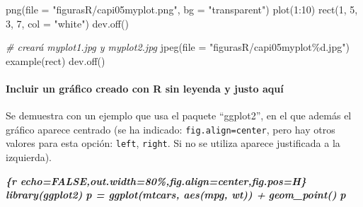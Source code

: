 \documentclass[12pt,a4paper,oneside,]{article}
\newenvironment{Shaded}{\begin{snugshade}}{\end{snugshade}}
\newcommand{\AttributeTok}[1]{\textcolor[rgb]{0.77,0.63,0.00}{#1}}
\newcommand{\CommentTok}[1]{\textcolor[rgb]{0.56,0.35,0.01}{\textit{#1}}}
\newcommand{\DecValTok}[1]{\textcolor[rgb]{0.00,0.00,0.81}{#1}}
\newcommand{\FunctionTok}[1]{\textcolor[rgb]{0.00,0.00,0.00}{#1}}
\newcommand{\InformationTok}[1]{\textcolor[rgb]{0.56,0.35,0.01}{\textbf{\textit{#1}}}}
\newcommand{\NormalTok}[1]{#1}
\newcommand{\SpecialCharTok}[1]{\textcolor[rgb]{0.00,0.00,0.00}{#1}}
\newcommand{\StringTok}[1]{\textcolor[rgb]{0.31,0.60,0.02}{#1}}
\let\oldparagraph\paragraph
\renewcommand{\paragraph}[1]{\oldparagraph{#1}\mbox{}}
\numberwithin{dummy}{section}
\theoremstyle{ocrenumbox}
\theoremstyle{blacknumex}
\theoremstyle{blacknumbox}
\theoremstyle{ocrenum}
\theoremstyle{ocrenum}
\begin{document}
\begin{Shaded}
\begin{Highlighting}[]
\FunctionTok{png}\NormalTok{(}\AttributeTok{file =} \StringTok{"figurasR/capi05myplot.png"}\NormalTok{, }\AttributeTok{bg =} \StringTok{"transparent"}\NormalTok{)}
\FunctionTok{plot}\NormalTok{(}\DecValTok{1}\SpecialCharTok{:}\DecValTok{10}\NormalTok{)}
\FunctionTok{rect}\NormalTok{(}\DecValTok{1}\NormalTok{, }\DecValTok{5}\NormalTok{, }\DecValTok{3}\NormalTok{, }\DecValTok{7}\NormalTok{, }\AttributeTok{col =} \StringTok{"white"}\NormalTok{)}
\FunctionTok{dev.off}\NormalTok{()}
\end{Highlighting}
\end{Shaded}

\begin{Shaded}
\begin{Highlighting}[]
 \CommentTok{\# creará myplot1.jpg y myplot2.jpg}
\FunctionTok{jpeg}\NormalTok{(}\AttributeTok{file =} \StringTok{"figurasR/capi05myplot\%d.jpg"}\NormalTok{)}
\FunctionTok{example}\NormalTok{(rect)}
\FunctionTok{dev.off}\NormalTok{()}
\end{Highlighting}
\end{Shaded}

\hypertarget{incluir-un-gruxe1fico-creado-con-r-sin-leyenda-y-justo-aquuxed}{%
\paragraph{Incluir un gráfico creado con R sin leyenda y justo
aquí}\label{incluir-un-gruxe1fico-creado-con-r-sin-leyenda-y-justo-aquuxed}}

Se demuestra con un ejemplo que usa el paquete ``ggplot2'', en el que
además el gráfico aparece centrado (se ha indicado:
\texttt{fig.align=\textquotesingle{}center\textquotesingle{}}, pero hay
otros valores para esta opción:
\texttt{\textquotesingle{}left\textquotesingle{}},
\texttt{\textquotesingle{}right\textquotesingle{}}. Si no se utiliza
aparece justificada a la izquierda).

\begin{Shaded}
\begin{Highlighting}[]
\InformationTok{\textasciigrave{}\textasciigrave{}\textasciigrave{}\{r echo=FALSE,out.width=\textquotesingle{}80\%\textquotesingle{},fig.align=\textquotesingle{}center\textquotesingle{},fig.pos=\textquotesingle{}H\textquotesingle{}\}}
\InformationTok{library(ggplot2)}
\InformationTok{p = ggplot(mtcars, aes(mpg, wt)) + }
\InformationTok{  geom\_point()}
\InformationTok{p  }
\InformationTok{\textasciigrave{}\textasciigrave{}\textasciigrave{}}
\end{Highlighting}
\end{Shaded}
\end{document}
